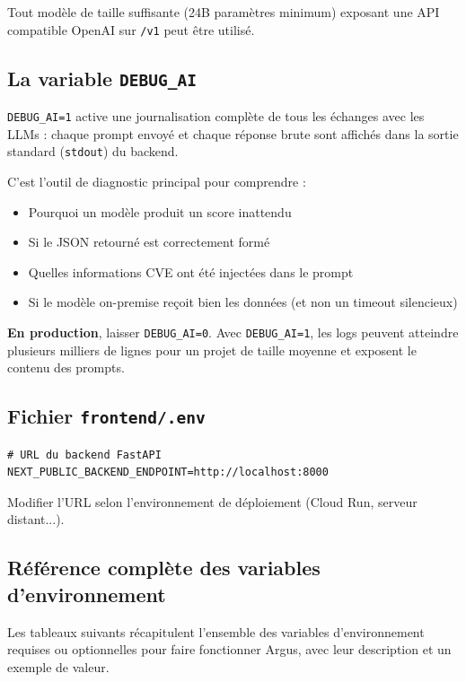 \documentclass[a4paper, 12pt, hidelinks]{article}
\begin{document}
Tout modèle de taille suffisante (24B paramètres minimum) exposant une API compatible OpenAI sur \texttt{/v1} peut être utilisé.

\subsection*{La variable \texttt{DEBUG\_AI}}

\texttt{DEBUG\_AI=1} active une journalisation complète de tous les échanges avec les LLMs : chaque prompt envoyé et chaque réponse brute sont affichés dans la sortie standard (\texttt{stdout}) du backend.

C'est l'outil de diagnostic principal pour comprendre :
\begin{itemize}
  \item Pourquoi un modèle produit un score inattendu
  \item Si le JSON retourné est correctement formé
  \item Quelles informations CVE ont été injectées dans le prompt
  \item Si le modèle on-premise reçoit bien les données (et non un timeout silencieux)
\end{itemize}

\begin{mdframed}[backgroundcolor=LightBlue]
\textbf{En production}, laisser \texttt{DEBUG\_AI=0}. Avec \texttt{DEBUG\_AI=1}, les logs peuvent atteindre plusieurs milliers de lignes pour un projet de taille moyenne et exposent le contenu des prompts.
\end{mdframed}

\subsection*{Fichier \texttt{frontend/.env}}

\begin{lstlisting}[caption={frontend/.env}]
# URL du backend FastAPI
NEXT_PUBLIC_BACKEND_ENDPOINT=http://localhost:8000
\end{lstlisting}

Modifier l'URL selon l'environnement de déploiement (Cloud Run, serveur distant...).

\subsection*{Référence complète des variables d'environnement}

Les tableaux suivants récapitulent l'ensemble des variables d'environnement requises ou optionnelles pour faire fonctionner Argus, avec leur description et un exemple de valeur.
\end{document}
